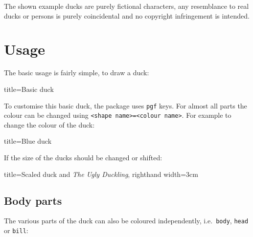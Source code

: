\documentclass[parskip=half]{scrartcl}
\begin{document}
The shown example ducks are purely fictional characters, any resemblance to real ducks or persons is purely coincidental and no copyright infringement is intended.

\section{Usage}

The basic usage is fairly simple, to draw a duck:
\begin{tcblisting}{title={Basic duck}}
\begin{tikzpicture}
	\duck
\end{tikzpicture}
\end{tcblisting}

To customise this basic duck, the package uses \lstinline|pgf| keys. For almost all parts the colour can be changed using \lstinline|<shape name>=<colour name>|. For example to change the colour of the duck:
\begin{tcblisting}{title={Blue duck}}
\begin{tikzpicture}
	\duck[body=blue]
\end{tikzpicture}
\end{tcblisting}

\clearpage
If the size of the ducks should be changed or shifted:

\begin{tcblisting}{title={Scaled duck and \emph{The Ugly Duckling}},	righthand width=3cm}
\begin{tikzpicture}[scale=0.6]
	\duck
	\begin{scope}[xshift=90pt, scale=.3, yshift=150pt]
		\duck
	\end{scope}
	\begin{scope}[xshift=60pt, scale=.3, yshift=100pt]
		\duck
	\end{scope}
	\begin{scope}[xshift=80pt, scale=.3, yshift=50pt]
		\duck[body=gray!50!white,head=gray!50!white]
	\end{scope}		
\end{tikzpicture}
\end{tcblisting}

\subsection{Body parts}

The various parts of the duck can also be coloured independently, i.e.\ \lstinline|body|, \lstinline|head| or \lstinline|bill|:
\end{document}
